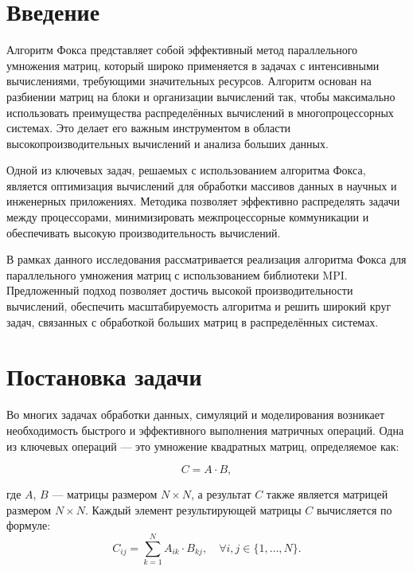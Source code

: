 \documentclass{report}
\begin{document}
	\setcounter{page}{2}

	\tableofcontents
	
	\newpage
	 
	\section*{Введение}   
	Алгоритм Фокса представляет собой эффективный метод параллельного умножения матриц, который широко применяется в задачах с интенсивными вычислениями, требующими значительных ресурсов. Алгоритм основан на разбиении матриц на блоки и организации вычислений так, чтобы максимально использовать преимущества распределённых вычислений в многопроцессорных системах. Это делает его важным инструментом в области высокопроизводительных вычислений и анализа больших данных.
	
	Одной из ключевых задач, решаемых с использованием алгоритма Фокса, является оптимизация вычислений для обработки массивов данных в научных и инженерных приложениях. Методика позволяет эффективно распределять задачи между процессорами, минимизировать межпроцессорные коммуникации и обеспечивать высокую производительность вычислений.
	
	В рамках данного исследования рассматривается реализация алгоритма Фокса для параллельного умножения матриц с использованием библиотеки MPI. Предложенный подход позволяет достичь высокой производительности вычислений, обеспечить масштабируемость алгоритма и решить широкий круг задач, связанных с обработкой больших матриц в распределённых системах.
		\newpage
	
	\section*{Постановка задачи} 
	
	Во многих задачах обработки данных, симуляций и моделирования возникает необходимость быстрого и эффективного выполнения матричных операций. Одна из ключевых операций — это умножение квадратных матриц, определяемое как:
	
	\[
	C = A \cdot B,
	\]
	
	где $A$, $B$ — матрицы размером $N \times N$, а результат $C$ также является матрицей размером $N \times N$. Каждый элемент результирующей матрицы $C$ вычисляется по формуле:
	\[
	C_{ij} = \sum_{k=1}^N A_{ik} \cdot B_{kj}, \quad \forall i, j \in \{1, \dots, N\}.
	\]
	
\end{document}
